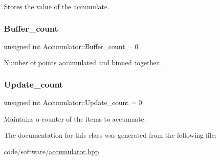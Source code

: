 Stores the value of the accumulate. 

\mbox{\label{classAccumulator_a6e4595169413a77122fe56cdd39137ae}} 
\subsubsection{\texorpdfstring{Buffer\+\_\+count}{Buffer\_count}}
{\footnotesize\ttfamily unsigned int Accumulator\+::\+Buffer\+\_\+count = 0}



Number of points accumulated and binned together. 

\mbox{\label{classAccumulator_afb010cbe82265d22e5d577033574a16b}} 
\subsubsection{\texorpdfstring{Update\+\_\+count}{Update\_count}}
{\footnotesize\ttfamily unsigned int Accumulator\+::\+Update\+\_\+count = 0\hspace{0.3cm}{\ttfamily [private]}}



Maintains a counter of the items to accumuate. 



The documentation for this class was generated from the following file\+:\begin{DoxyCompactItemize}
\item 
code/software/\hyperlink{accumulator_8hpp}{accumulator.\+hpp}\end{DoxyCompactItemize}
